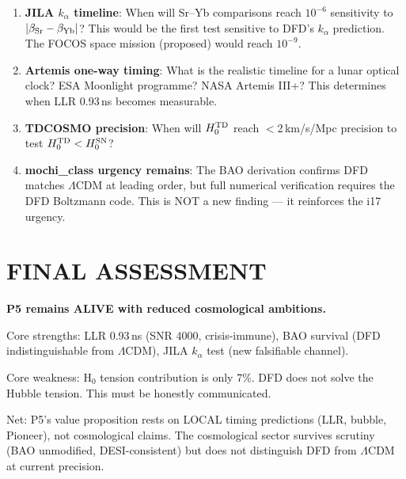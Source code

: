 \documentclass[11pt]{article}
\begin{document}
\begin{enumerate}
\item \textbf{JILA $k_\alpha$ timeline}: When will Sr--Yb comparisons
  reach $10^{-6}$ sensitivity to $|\beta_{\rm Sr} - \beta_{\rm Yb}|$?
  This would be the first test sensitive to DFD's $k_\alpha$ prediction.
  The FOCOS space mission (proposed) would reach $10^{-9}$.

\item \textbf{Artemis one-way timing}: What is the realistic timeline
  for a lunar optical clock? ESA Moonlight programme? NASA Artemis III+?
  This determines when LLR 0.93\,ns becomes measurable.

\item \textbf{TDCOSMO precision}: When will $H_0^{\rm TD}$ reach
  $<$2\,km/s/Mpc precision to test $H_0^{\rm TD} < H_0^{\rm SN}$?

\item \textbf{mochi\_class urgency remains}: The BAO derivation confirms
  DFD matches $\Lambda$CDM at leading order, but full numerical
  verification requires the DFD Boltzmann code. This is NOT a new
  finding --- it reinforces the i17 urgency.
\end{enumerate}

\section*{FINAL ASSESSMENT}

\begin{tcolorbox}[colback=blue!5!white, colframe=blue!70!black]
\textbf{P5 remains ALIVE with reduced cosmological ambitions.}

Core strengths: LLR 0.93\,ns (SNR 4000, crisis-immune), BAO survival
(DFD indistinguishable from $\Lambda$CDM), JILA $k_\alpha$ test
(new falsifiable channel).

Core weakness: H$_0$ tension contribution is only 7\%. DFD does not
solve the Hubble tension. This must be honestly communicated.

Net: P5's value proposition rests on LOCAL timing predictions
(LLR, bubble, Pioneer), not cosmological claims. The cosmological sector
survives scrutiny (BAO unmodified, DESI-consistent) but does not
distinguish DFD from $\Lambda$CDM at current precision.
\end{tcolorbox}
\end{document}
